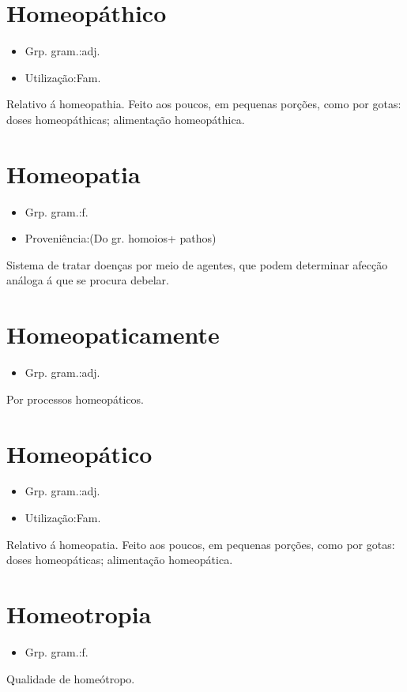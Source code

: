 \documentclass{article}
\begin{document}
\section{Homeopáthico}
\begin{itemize}
\item {Grp. gram.:adj.}
\end{itemize}
\begin{itemize}
\item {Utilização:Fam.}
\end{itemize}
Relativo á homeopathia.
Feito aos poucos, em pequenas porções, como por gotas: \textunderscore doses homeopáthicas\textunderscore ; \textunderscore alimentação homeopáthica\textunderscore .
\section{Homeopatia}
\begin{itemize}
\item {Grp. gram.:f.}
\end{itemize}
\begin{itemize}
\item {Proveniência:(Do gr. \textunderscore homoios\textunderscore  + \textunderscore pathos\textunderscore )}
\end{itemize}
Sistema de tratar doenças por meio de agentes, que podem determinar afecção análoga á que se procura debelar.
\section{Homeopaticamente}
\begin{itemize}
\item {Grp. gram.:adj.}
\end{itemize}
Por processos homeopáticos.
\section{Homeopático}
\begin{itemize}
\item {Grp. gram.:adj.}
\end{itemize}
\begin{itemize}
\item {Utilização:Fam.}
\end{itemize}
Relativo á homeopatia.
Feito aos poucos, em pequenas porções, como por gotas: \textunderscore doses homeopáticas\textunderscore ; \textunderscore alimentação homeopática\textunderscore .
\section{Homeotropia}
\begin{itemize}
\item {Grp. gram.:f.}
\end{itemize}
Qualidade de homeótropo.
\end{document}
